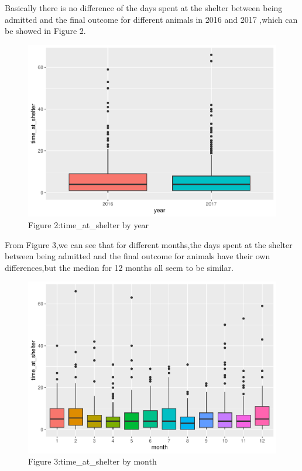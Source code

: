 \documentclass[
]{article}
\begin{document}
Basically there is no difference of the days spent at the shelter
between being admitted and the final outcome for different animals in
2016 and 2017 ,which can be showed in Figure 2.

\begin{figure}[H]

{\centering \includegraphics[width=0.68\linewidth]{Group_16_Project_files/figure-latex/unnamed-chunk-3-1} 

}

\caption{\label{fig:box} Figure 2:time\_at\_shelter by year}\label{fig:unnamed-chunk-3}
\end{figure}

From Figure 3,we can see that for different months,the days spent at the
shelter between being admitted and the final outcome for animals have
their own differences,but the median for 12 months all seem to be
similar.

\begin{figure}[H]

{\centering \includegraphics[width=0.68\linewidth]{Group_16_Project_files/figure-latex/unnamed-chunk-4-1} 

}

\caption{\label{fig:box} Figure 3:time\_at\_shelter by month}\label{fig:unnamed-chunk-4}
\end{figure}
\end{document}

